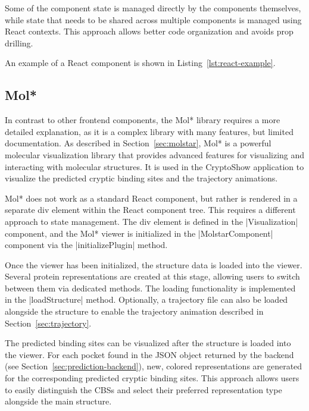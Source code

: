 Some of the component state is managed directly by the components themselves, while state that needs to be shared across multiple components is managed using React contexts. This approach allows better code organization and avoids prop drilling.

An example of a React component is shown in Listing~\ref{lst:react-example}.



\subsection{Mol*}
\label{sec:molstar-frontend}

In contrast to other frontend components, the Mol* library requires a more detailed explanation, as it is a complex library with many features, but limited documentation. As described in Section~\ref{sec:molstar}, Mol* is a powerful molecular visualization library that provides advanced features for visualizing and interacting with molecular structures. It is used in the CryptoShow application to visualize the predicted cryptic binding sites and the trajectory animations.

Mol* does not work as a standard React component, but rather is rendered in a separate div element within the React component tree. This requires a different approach to state management. The div element is defined in the \inline|Visualization| component, and the Mol* viewer is initialized in the \inline|MolstarComponent| component via the \inline|initializePlugin| method.

Once the viewer has been initialized, the structure data is loaded into the viewer. Several protein representations are created at this stage, allowing users to switch between them via dedicated methods. The loading functionality is implemented in the \inline|loadStructure| method. Optionally, a trajectory file can also be loaded alongside the structure to enable the trajectory animation described in Section~\ref{sec:trajectory}.

The predicted binding sites can be visualized after the structure is loaded into the viewer. For each pocket found in the JSON object returned by the backend (see Section~\ref{sec:prediction-backend}), new, colored representations are generated for the corresponding predicted cryptic binding sites. This approach allows users to easily distinguish the CBSs and select their preferred representation type alongside the main structure.

